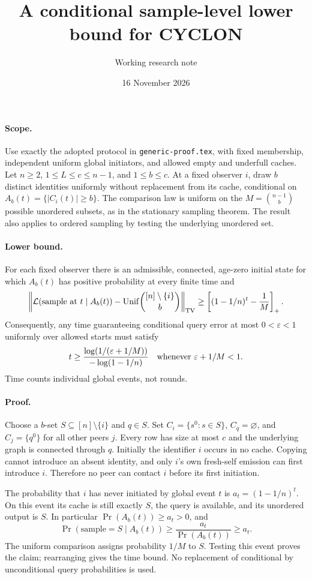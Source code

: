 \documentclass[11pt]{article}
\title{A conditional sample-level lower bound for CYCLON}
\author{Working research note}
\date{16 November 2026}
\begin{document}
\maketitle
\paragraph{Scope.}
Use exactly the adopted protocol in \texttt{generic-proof.tex}, with fixed
membership, independent uniform global initiators, and allowed empty and
underfull caches. Let $n\ge2$, $1\le L\le c\le n-1$, and $1\le b\le c$.
At a fixed observer $i$, draw $b$ distinct identities uniformly without
replacement from its cache, conditional on $A_b(t)=\{|C_i(t)|\ge b\}$.
The comparison law is uniform on the $M=\binom{n-1}{b}$ possible unordered
subsets, as in the stationary sampling theorem. The result also applies
to ordered sampling by testing the underlying unordered set.

\paragraph{Lower bound.}
For each fixed observer there is an admissible, connected, age-zero initial
state for which $A_b(t)$ has positive probability at every finite time and
\[
 \left\|\mathcal L(\text{sample at }t\mid A_b(t))
              -\operatorname{Unif}\!\binom{[n]\setminus\{i\}}b\right\|_{\rm TV}
 \ge\left[(1-1/n)^t-\frac1M\right]_+.
\]
Consequently, any time guaranteeing conditional query error at most
$0<\varepsilon<1$ uniformly over allowed starts must satisfy
\[
 t\ge\frac{\log(1/(\varepsilon+1/M))}{-\log(1-1/n)}
 \quad\hbox{whenever }\varepsilon+1/M<1.
\]
Time counts individual global events, not rounds.

\paragraph{Proof.}
Choose a $b$-set $S\subseteq[n]\setminus\{i\}$ and $q\in S$. Set
$C_i=\{s^0:s\in S\}$, $C_q=\varnothing$, and
$C_j=\{q^0\}$ for all other peers $j$. Every row has size at most $c$ and
the underlying graph is connected through $q$. Initially the identifier
$i$ occurs in no cache. Copying cannot introduce an absent identity, and
only $i$'s own fresh-self emission can first introduce $i$. Therefore no
peer can contact $i$ before its first initiation.

The probability that $i$ has never initiated by global event $t$ is
$a_t=(1-1/n)^t$. On this event its cache is still exactly $S$, the query is
available, and its unordered output is $S$. In particular
$\Pr(A_b(t))\ge a_t>0$, and
\[
 \Pr(\text{sample}=S\mid A_b(t))
 \ge\frac{a_t}{\Pr(A_b(t))}\ge a_t.
\]
The uniform comparison assigns probability $1/M$ to $S$. Testing this event
proves the claim; rearranging gives the time bound. No replacement of
conditional by unconditional query probabilities is used.
\end{document}
